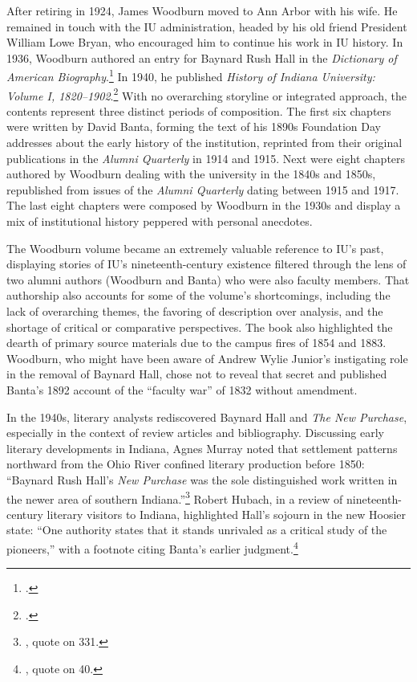 \documentclass[
  american,
  letterpaper,
]{scrreprt}
\begin{document}
After retiring in 1924, James Woodburn moved to Ann Arbor with his wife.
He remained in touch with the IU administration, headed by his old
friend President William Lowe Bryan, who encouraged him to continue his
work in IU history. In 1936, Woodburn authored an entry for Baynard Rush
Hall in the \emph{Dictionary of American Biography}.\footnote{.} In 1940, he published \emph{History of Indiana
University: Volume I, 1820--1902}.\footnote{.} With no overarching
storyline or integrated approach, the contents represent three distinct
periods of composition. The first six chapters were written by David
Banta, forming the text of his 1890s Foundation Day addresses about the
early history of the institution, reprinted from their original
publications in the \emph{Alumni Quarterly} in 1914 and 1915. Next were
eight chapters authored by Woodburn dealing with the university in the
1840s and 1850s, republished from issues of the \emph{Alumni Quarterly}
dating between 1915 and 1917. The last eight chapters were composed by
Woodburn in the 1930s and display a mix of institutional history
peppered with personal anecdotes.

The Woodburn volume became an extremely valuable reference to IU's past,
displaying stories of IU's nineteenth-century existence filtered through
the lens of two alumni authors (Woodburn and Banta) who were also
faculty members. That authorship also accounts for some of the volume's
shortcomings, including the lack of overarching themes, the favoring of
description over analysis, and the shortage of critical or comparative
perspectives. The book also highlighted the dearth of primary source
materials due to the campus fires of 1854 and 1883. Woodburn, who might
have been aware of Andrew Wylie Junior's instigating role in the removal
of Baynard Hall, chose not to reveal that secret and published Banta's
1892 account of the ``faculty war'' of 1832 without amendment.

In the 1940s, literary analysts rediscovered Baynard Hall and \emph{The
New Purchase}, especially in the context of review articles and
bibliography. Discussing early literary developments in Indiana, Agnes
Murray noted that settlement patterns northward from the Ohio River
confined literary production before 1850: ``Baynard Rush Hall's
\emph{New Purchase} was the sole distinguished work written in the newer
area of southern Indiana.''\footnote{, quote on 331.} Robert
Hubach, in a review of nineteenth-century literary visitors to Indiana,
highlighted Hall's sojourn in the new Hoosier state: ``One authority
states that it stands unrivaled as a critical study of the pioneers,''
with a footnote citing Banta's earlier judgment.\footnote{, quote on 40.}
\end{document}
